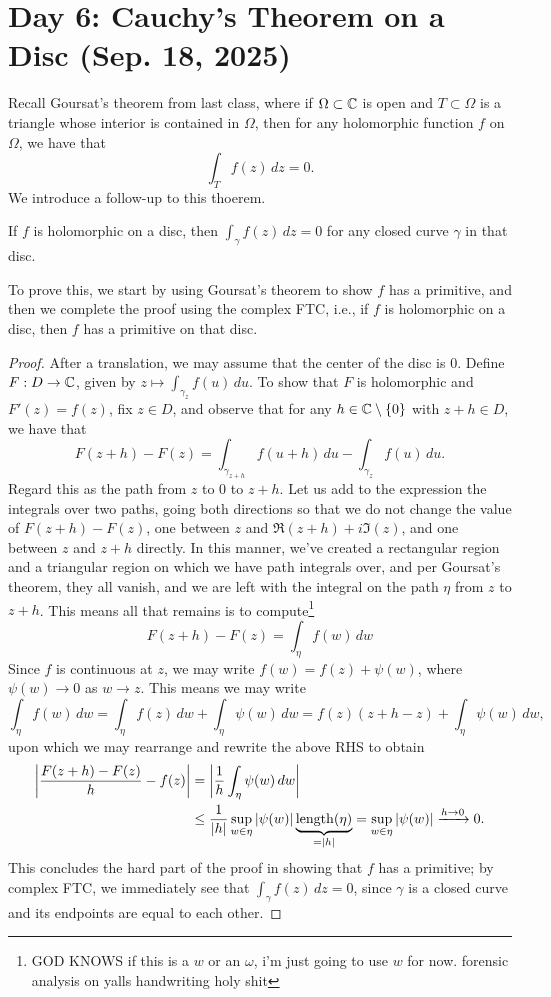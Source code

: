 \section{Day 6: Cauchy's Theorem on a Disc (Sep. 18, 2025)}
Recall Goursat's theorem from last class, where if $\Omega \subset \mathbb C$ is open and $T \subset \Omega$ is a triangle whose interior is contained in $\Omega$, then for any holomorphic function $f$ on $\Omega$, we have that
\[ \int_T f(z) \, dz = 0. \]
We introduce a follow-up to this thoerem.
\begin{theorem}
    If $f$ is holomorphic on a disc, then $\int_\gamma f(z) \, dz = 0$ for any closed curve $\gamma$ in that disc.
\end{theorem}
\noindent To prove this, we start by using Goursat's theorem to show $f$ has a primitive, and then we complete the proof using the complex FTC, i.e., if $f$ is holomorphic on a disc, then $f$ has a primitive on that disc.
\begin{proof}
    After a translation, we may assume that the center of the disc is $0$. Define $F : D \to \mathbb C$, given by $z \mapsto \int_{\gamma_z} f(u) \, du$. To show that $F$ is holomorphic and $F'(z) = f(z)$, fix $z \in D$, and observe that for any $h \in \mathbb C \setminus \{0\}$ with $z + h \in D$, we have that
    \[ F(z+h) - F(z) = \int_{\gamma_{z+h}} f(u + h) \, du - \int_{\gamma_z} f(u) \, du. \]
    Regard this as the path from $z$ to $0$ to $z+h$. Let us add to the expression the integrals over two paths, going both directions so that we do not change the value of $F(z+h) - F(z)$, one between $z$ and $\Re(z+h) + i \Im(z)$, and one between $z$ and $z+h$ directly. In this manner, we've created a rectangular region and a triangular region on which we have path integrals over, and per Goursat's theorem, they all vanish, and we are left with the integral on the path $\eta$ from $z$ to $z+h$. This means all that remains is to compute\footnote{GOD KNOWS if this is a $w$ or an $\omega$, i'm just going to use $w$ for now. forensic analysis on yalls handwriting holy shit}
    \[ F(z + h) - F(z) = \int_{\eta} f(w) \, dw \]
    Since $f$ is continuous at $z$, we may write $f(w) = f(z) + \psi(w)$, where $\psi(w) \to 0$ as $w \to z$. This means we may write
    \[ \int_\eta f(w) \, dw = \int_\eta f(z) \, dw + \int_\eta \psi(w) \, dw = f(z)(z+h - z) + \int_\eta \psi(w) \, dw, \]
    upon which we may rearrange and rewrite the above RHS to obtain
    \begin{align*}
        \left\lvert \frac{F(z+h) - F(z)}{h} - f(z) \right\rvert &= \left\lvert \frac{1}{h} \int_\eta \psi(w) \, dw \right\rvert \\
        &\leq \frac{1}{\left\lvert h \right\rvert} \sup_{w \in \eta} \left\lvert \psi(w) \right\rvert \underbrace{\operatorname{length}(\eta)}_{=\left\lvert h \right\rvert} = \sup_{w \in \eta} \left\lvert \psi(w) \right\rvert \xrightarrow{h \to 0} 0.
    \end{align*}
    This concludes the hard part of the proof in showing that $f$ has a primitive; by complex FTC, we immediately see that $\int_\gamma f(z) \, dz = 0$, since $\gamma$ is a closed curve and its endpoints are equal to each other.
\end{proof}


